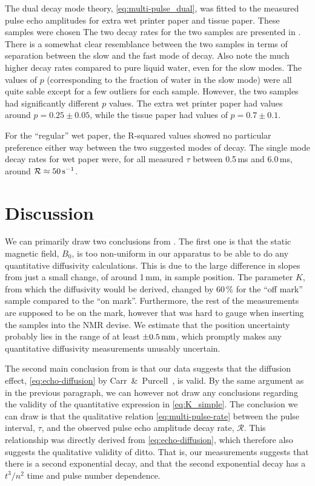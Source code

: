 \documentclass[11pt,a4paper, twocolumn,
swedish, english %
]{article}
\begin{document}
The dual decay mode theory, \eqref{eq:multi-pulse_dual}, was fitted to
the measured pulse echo amplitudes for extra wet printer paper and
tissue paper. These samples were chosen 
The two decay rates for the two samples are presented in
. There is a somewhat clear resemblance between
the two samples in terms of separation between the slow and the fast
mode of decay. Also note the much higher decay rates compared to pure
liquid  water, even for the slow modes. The values of $p$
(corresponding to the fraction of water in the slow mode) were all
quite sable except for a few outliers for each sample. However, the
two samples had significantly different $p$ values. The extra wet
printer paper had values around $p=0.25\pm0.05$, while the tissue
paper had values of $p=0.7\pm0.1$.

For the ``regular'' wet paper, the R-squared values showed no
particular preference either way between the two suggested modes of
decay. The single mode decay rates for wet paper were, for all
measured $\tau$ between 0.5\,ms and 6.0\,ms, around
$\mathcal{R}\approx\unit[50]{s^{-1}}$. 


\section{Discussion}

We can primarily draw two conclusions from . The
first one is that the static magnetic field, $B_0$, is too non-uniform
in our apparatus to be able to do any quantitative diffusivity
calculations. This is due to the large difference in slopes from just
a small change, of around 1\,mm, in sample position. The parameter
$K$, from which the diffusivity would be derived, changed by 60\,\%
for the ``off mark'' sample compared to the ``on mark''. Furthermore,
the rest of the measurements are supposed to be on the mark, however
that was hard to gauge when inserting the samples into the NMR
devise. We estimate that the position uncertainty probably lies in the
range of at least $\pm\unit[0.5]{mm}$, which promptly makes any
quantitative diffusivity measurements unusably uncertain.

The second main conclusion from  is that our
data suggests that the diffusion effect, \eqref{eq:echo-diffusion} by
Carr~\&~Purcell~\cite{Carr-Purcell1954}, is valid. By the same
argument as in the previous paragraph, we can however not draw any
conclusions regarding the validity of the quantitative expression in
\eqref{eq:K_simple}. The conclusion we can draw is that the
qualitative relation \eqref{eq:multi-pulse-rate} between the pulse
interval, $\tau$, and the observed pulse echo amplitude decay rate,
$\mathcal{R}$. This relationship was directly derived from
\eqref{eq:echo-diffusion}, which therefore also suggests the
qualitative validity of ditto. That is, our measurements suggests that
there is a second exponential decay, and that the second exponential
decay has a $t^3/n^2$ time and pulse number dependence. 
\end{document}
